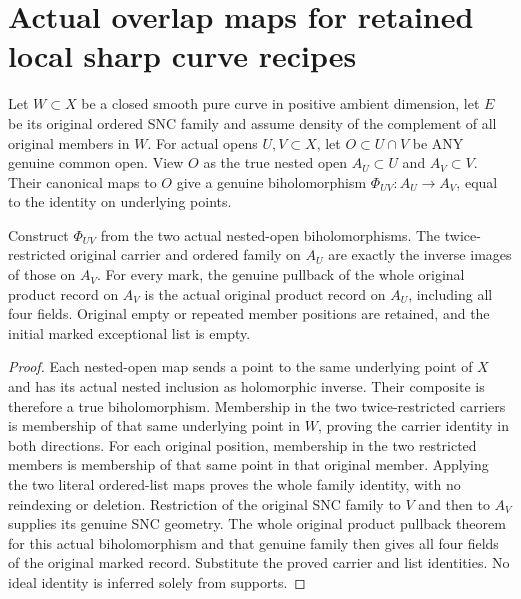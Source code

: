 \section{Actual overlap maps for retained local sharp curve recipes}

Let $W\subset X$ be a closed smooth pure curve in positive ambient dimension,
let $E$ be its original ordered SNC family and assume density of the complement
of all original members in $W$. For actual opens $U,V\subset X$, let $O\subset U\cap V$ be ANY genuine common open.
View $O$ as the true nested open $A_U\subset U$ and $A_V\subset V$.
Their canonical maps to $O$ give a genuine biholomorphism
$\Phi_{UV}:A_U\longrightarrow A_V$, equal to the identity on underlying points.

\begin{theorem}
\label{hir:sharp-actual-curve-overlap-original-data}
\leanok
Construct $\Phi_{UV}$ from the two actual nested-open biholomorphisms.
The twice-restricted original carrier and ordered family on $A_U$ are exactly
the inverse images of those on $A_V$. For every mark, the genuine pullback of
the whole original product record on $A_V$ is the actual original product
record on $A_U$, including all four fields. Original empty or repeated member
positions are retained, and the initial marked exceptional list is empty.
\end{theorem}
\begin{proof}
Each nested-open map sends a point to the same underlying point of $X$ and
has its actual nested inclusion as holomorphic inverse. Their composite is
therefore a true biholomorphism. Membership in the two twice-restricted
carriers is membership of that same underlying point in $W$, proving the
carrier identity in both directions. For each original position, membership
in the two restricted members is membership of that same point in that
original member. Applying the two literal ordered-list maps proves the whole
family identity, with no reindexing or deletion. Restriction of the original
SNC family to $V$ and then to $A_V$ supplies its genuine SNC geometry. The
whole original product pullback theorem for this actual biholomorphism and
that genuine family then gives all four fields of the original marked record.
Substitute the proved carrier and list identities. No ideal identity is
inferred solely from supports.
\end{proof}

